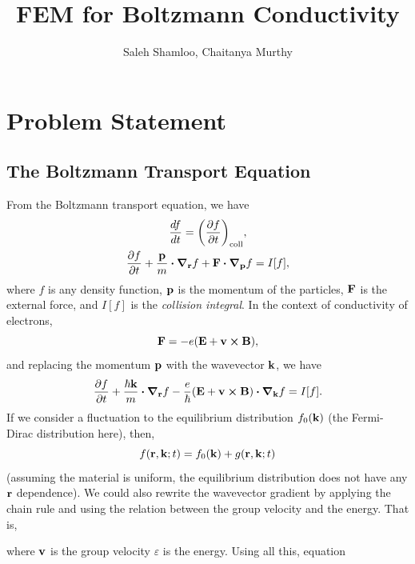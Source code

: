 \documentclass[12pt]{article}
\title{FEM for Boltzmann Conductivity}
\author{Saleh Shamloo, Chaitanya Murthy}
\begin{document}
\maketitle
\section{Problem Statement}
\subsection{The Boltzmann Transport Equation}
From the Boltzmann transport equation, we have
\begin{gather}
    \dv{f}{t} = \qty(\pdv{f}{t})_{\text{coll}}, \\
    \pdv{f}{t} + \frac{\vb{p}}{m}\vdot\grad_{\vb{r}} f + \vb{F}\vdot\grad_{\vb{p}}f = I[f],
\end{gather}
where $f$ is any density function, $\vb{p}$ is the momentum of the particles, $\vb{F}$ is the
external force, and $I[f]$ is the \emph{collision integral}. In the context of conductivity of
electrons,
\begin{equation}
    \vb{F} = -e\qty(\vb{E} + \vb{v}\cross\vb{B}),
\end{equation}
and replacing the momentum $\vb{p}$ with the wavevector $\vb{k}$, we have
\begin{equation}
    \pdv{f}{t} + \frac{\hbar\vb{k}}{m}\vdot\grad_{\vb{r}} f
    - \frac{e}{\hbar}\qty(\vb{E} + \vb{v}\cross\vb{B})\vdot\grad_{\vb{k}}f = I[f].
    \label{eq:boltzmann_general}
\end{equation}
If we consider a fluctuation to the equilibrium distribution $f_0(\vb{k})$ (the Fermi-Dirac
distribution here), then,
\begin{equation}
    f(\vb{r}, \vb{k}; t) = f_0(\vb{k}) + g(\vb{r}, \vb{k}; t)
\end{equation}
(assuming the material is uniform, the equilibrium distribution does not have any $\vb{r}$
dependence). We could also rewrite the wavevector gradient by applying the chain rule and using
the relation between the group velocity and the energy. That is,
where $\vb{v}$ is the group velocity $\varepsilon$ is the energy. Using all this, equation
\end{document}
